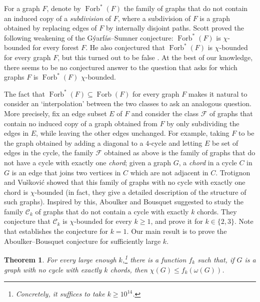 \documentclass[11pt,english]{article}
\theoremstyle{plain}
\newtheorem{thm}{Theorem}[section]
\theoremstyle{definition}
\theoremstyle{remark}
\newcommand{\C}{\mathcal{C}}
\newcommand{\FF}{\mathcal{F}}
\DeclareMathOperator{\Forb}{Forb}
\newcommand{\Forbstar}{\Forb^*}
\begin{document}
    For a graph $F$, denote by $\Forbstar(F)$ the family of graphs that do not contain an induced copy of a \emph{subdivision} of $F$, where a subdivision of $F$ is a graph obtained by replacing edges of $F$ by internally disjoint paths. 
    Scott \cite{scott1997induced} proved the following weakening of the G\'yarf\'as--Sumner conjecture: $\Forbstar(F)$ is $\chi$-bounded for every forest $F$. He also conjectured that $\Forbstar(F)$ is $\chi$-bounded for every graph $F$, but this turned out to be false \cite{pawlik2014triangle,chalpion2016restricted}. At the best of our knowledge, there seems to be no conjectured answer to the question that asks for which graphs $F$ is $\Forbstar(F)$ $\chi$-bounded.
    
    The fact that $\Forbstar(F) \subseteq \Forb(F)$ for every graph $F$ makes it natural to consider an `interpolation' between the two classes to ask an analogous question.
    More precisely, 
    fix an edge subset $E$ of $F$ and consider the class $\FF$ of graphs that contain no induced copy of a graph obtained from $F$ by only subdividing the edges in $E$, while leaving the other edges unchanged.
    For example, taking $F$ to be the graph obtained by adding a diagonal to a $4$-cycle and letting $E$ be set of edges in the cycle, the family $\FF$ obtained as above is the family of graphs that do not have a cycle with exactly one \emph{chord}; given a graph $G$, a \emph{chord} in a cycle $C$ in $G$ is an edge that joins two vertices in $C$ which are not adjacent in $C$.
    Trotignon and Vu\v{s}kovi\'c \cite{trotignon2010structure} showed that this family of graphs with no cycle with exactly one chord is $\chi$-bounded (in fact, they give a detailed description of the structure of such graphs). Inspired by this, Aboulker and Bousquet \cite{aboulker2015excluding} suggested to study the family $\C_k$ of graphs that do not contain a cycle with exactly $k$ chords. They conjecture that $\C_k$ is $\chi$-bounded for every $k \ge 1$, and prove it for $k \in \{2, 3\}$. Note that \cite{trotignon2010structure} establishes the conjecture for $k = 1$. Our main result is to prove the Aboulker--Bousquet conjecture for sufficiently large $k$.
    
	\begin{thm} \label{thm:main}
	    For every large enough $k$,\footnote{Concretely, it suffices to take $k \ge 10^{14}$.} there is a function $f_k$ such that, if $G$ is a graph with no cycle with exactly $k$ chords, then $\chi(G) \le f_k(\omega(G))$.
	\end{thm}
	
\end{document}
